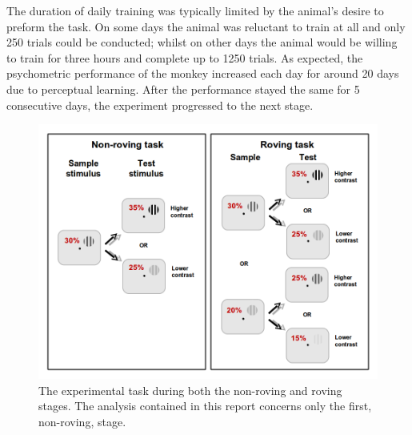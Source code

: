 The duration of daily training was typically limited by the animal's desire to preform the task. On some days the animal was reluctant to train at all and only 250 trials could be conducted; whilst on other days the animal would be willing to train for three hours and complete up to 1250 trials.
As expected, the psychometric performance of the monkey increased each day for around 20 days due to perceptual learning. After the performance stayed the same for 5 consecutive days, the experiment progressed to the next stage.


\begin{figure}[htbp]
\begin{center}
\includegraphics[width=0.8\linewidth]{./figs/info/PLtask2.png}
\end{center}
\caption{The experimental task during both the non-roving and roving stages. The analysis contained in this report concerns only the first, non-roving, stage.}
\label{fig:pltask2}
\end{figure}



